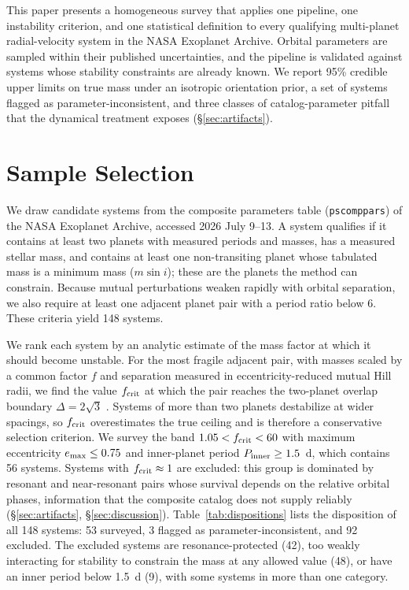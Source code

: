 \documentclass[twocolumn]{aastex631}
\newcommand{\msini}{m\sin i}
\begin{document}
This paper presents a homogeneous survey that applies one pipeline, one
instability criterion, and one statistical definition to every qualifying
multi-planet radial-velocity system in the NASA Exoplanet Archive. Orbital
parameters are sampled within their published uncertainties, and the
pipeline is validated against systems whose stability constraints are
already known. We report 95\% credible upper limits on true mass under an
isotropic orientation prior, a set of systems flagged as
parameter-inconsistent, and three classes of catalog-parameter pitfall
that the dynamical treatment exposes (\S\ref{sec:artifacts}).

\section{Sample Selection} \label{sec:sample}

We draw candidate systems from the composite parameters table
(\texttt{pscomppars}) of the NASA Exoplanet Archive, accessed 2026
July 9--13. A system qualifies if it contains at least two planets with
measured periods and masses, has a measured stellar mass, and contains at
least one non-transiting planet whose tabulated mass is a minimum mass
($\msini$); these are the planets the method can constrain. Because mutual
perturbations weaken rapidly with orbital separation, we also require at
least one adjacent planet pair with a period ratio below 6. These criteria
yield 148 systems.

We rank each system by an analytic estimate of the mass factor at which it
should become unstable. For the most fragile adjacent pair, with masses
scaled by a common factor $f$ and separation measured in
eccentricity-reduced mutual Hill radii, we find the value $f_{\rm crit}$
at which the pair reaches the two-planet overlap boundary
$\Delta = 2\sqrt{3}$ \citep{Gladman1993}. Systems of more than two planets
destabilize at wider spacings, so $f_{\rm crit}$ overestimates the true
ceiling and is therefore a conservative selection criterion. We survey the
band $1.05 < f_{\rm crit} < 60$ with maximum eccentricity
$e_{\rm max} \le 0.75$ and inner-planet period $P_{\rm inner} \ge 1.5$~d,
which contains 56 systems. Systems with $f_{\rm crit} \approx 1$ are
excluded: this group is dominated by resonant and near-resonant pairs
whose survival depends on the relative orbital phases, information that the
composite catalog does not supply reliably (\S\ref{sec:artifacts},
\S\ref{sec:discussion}). Table~\ref{tab:dispositions} lists the
disposition of all 148 systems: 53 surveyed, 3 flagged as
parameter-inconsistent, and 92 excluded. The excluded systems are
resonance-protected (42), too weakly interacting for stability to
constrain the mass at any allowed value (48), or have an inner period
below 1.5~d (9), with some systems in more than one category.
\end{document}
